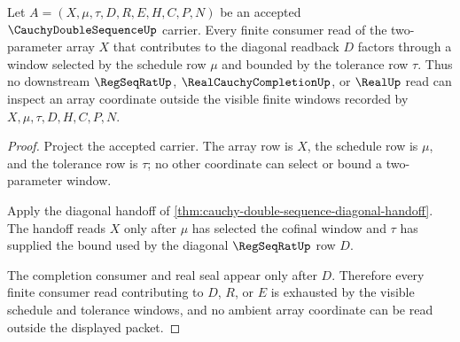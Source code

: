 \begin{theorem}\label{thm:cauchy-double-sequence-window-diagonal-exhaustion}
Let $A=(X,\mu,\tau,D,R,E,H,C,P,N)$ be an accepted $\CauchyDoubleSequenceUp$ carrier. Every finite consumer read of the two-parameter array $X$ that contributes to the diagonal readback $D$ factors through a window selected by the schedule row $\mu$ and bounded by the tolerance row $\tau$. Thus no downstream $\RegSeqRatUp$, $\RealCauchyCompletionUp$, or $\RealUp$ read can inspect an array coordinate outside the visible finite windows recorded by $X,\mu,\tau,D,H,C,P,N$.
\end{theorem}
\begin{proof}
Project the accepted carrier. The array row is $X$, the schedule row is $\mu$, and the tolerance row is $\tau$; no other coordinate can select or bound a two-parameter window.

Apply the diagonal handoff of \autoref{thm:cauchy-double-sequence-diagonal-handoff}. The handoff reads $X$ only after $\mu$ has selected the cofinal window and $\tau$ has supplied the bound used by the diagonal $\RegSeqRatUp$ row $D$.

The completion consumer and real seal appear only after $D$. Therefore every finite consumer read contributing to $D$, $R$, or $E$ is exhausted by the visible schedule and tolerance windows, and no ambient array coordinate can be read outside the displayed packet.
\end{proof}

